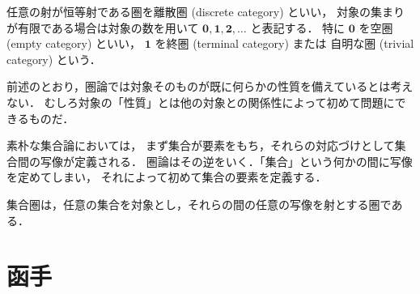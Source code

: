 \documentclass[titlepage]{ltjsreport}
\begin{document}
\begin{definition}[離散圏]
  任意の射が恒等射である圏を離散圏 (discrete category) といい，
  対象の集まりが有限である場合は対象の数を用いて
  $\mathbf{0},\mathbf{1},\mathbf{2},\ldots$ と表記する．
  特に $\mathbf{0}$ を空圏 (empty category) といい，
  $\mathbf{1}$ を終圏 (terminal category) または
  自明な圏 (trivial category) という．
\end{definition}

前述のとおり，圏論では対象そのものが既に何らかの性質を備えているとは考えない．
むしろ対象の「性質」とは他の対象との関係性によって初めて問題にできるものだ．

素朴な集合論においては，
まず集合が要素をもち，それらの対応づけとして集合間の写像が定義される．
圏論はその逆をいく．「集合」という何かの間に写像を定めてしまい，
それによって初めて集合の要素を定義する．

\begin{definition}[集合圏]
  集合圏は，任意の集合を対象とし，それらの間の任意の写像を射とする圏である．
\end{definition}

\section{函手}
\end{document}
